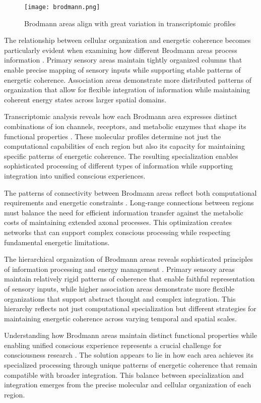 \begin{refsection}
\begin{figure}[h]
    \centering
    \texttt{[image: brodmann.png]}

    \caption{Brodmann areas align with great variation in transcriptomic profiles}
\end{figure}

The relationship between cellular organization and energetic coherence becomes particularly evident when examining how different Brodmann areas process information \cite{Passingham2002}. Primary sensory areas maintain tightly organized columns that enable precise mapping of sensory inputs while supporting stable patterns of energetic coherence. Association areas demonstrate more distributed patterns of organization that allow for flexible integration of information while maintaining coherent energy states across larger spatial domains.

Transcriptomic analysis reveals how each Brodmann area expresses distinct combinations of ion channels, receptors, and metabolic enzymes that shape its functional properties \cite{Lake2018}. These molecular profiles determine not just the computational capabilities of each region but also its capacity for maintaining specific patterns of energetic coherence. The resulting specialization enables sophisticated processing of different types of information while supporting integration into unified conscious experiences.

The patterns of connectivity between Brodmann areas reflect both computational requirements and energetic constraints \cite{VanEssen2012}. Long-range connections between regions must balance the need for efficient information transfer against the metabolic costs of maintaining extended axonal processes. This optimization creates networks that can support complex conscious processing while respecting fundamental energetic limitations.

The hierarchical organization of Brodmann areas reveals sophisticated principles of information processing and energy management \cite{Amunts2015}. Primary sensory areas maintain relatively rigid patterns of coherence that enable faithful representation of sensory inputs, while higher association areas demonstrate more flexible organizations that support abstract thought and complex integration. This hierarchy reflects not just computational specialization but different strategies for maintaining energetic coherence across varying temporal and spatial scales.

Understanding how Brodmann areas maintain distinct functional properties while enabling unified conscious experience represents a crucial challenge for consciousness research \cite{Scholtens2014}. The solution appears to lie in how each area achieves its specialized processing through unique patterns of energetic coherence that remain compatible with broader integration. This balance between specialization and integration emerges from the precise molecular and cellular organization of each region.


\end{refsection}
